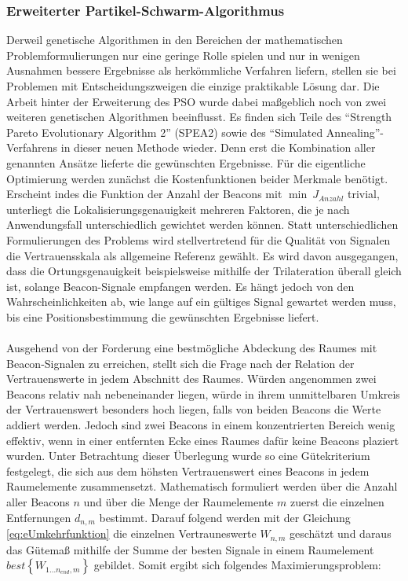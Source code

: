 \subsubsection{Erweiterter Partikel-Schwarm-Algorithmus}
Derweil genetische Algorithmen in den Bereichen der mathematischen Problemformulierungen nur eine geringe Rolle spielen und nur in wenigen Ausnahmen bessere Ergebnisse als herkömmliche Verfahren liefern, stellen sie bei Problemen mit Entscheidungszweigen die einzige praktikable Lösung dar. Die Arbeit hinter der Erweiterung des PSO wurde dabei maßgeblich noch von zwei weiteren genetischen Algorithmen beeinflusst. Es finden sich Teile des "`Strength Pareto Evolutionary Algorithm 2"' (SPEA2) \cite{SPEA2} sowie des "`Simulated Annealing"'-Verfahrens \cite{SimAnn} in dieser neuen Methode wieder. Denn erst die Kombination aller genannten Ansätze lieferte die gewünschten Ergebnisse. Für die eigentliche Optimierung werden zunächst die Kostenfunktionen beider Merkmale benötigt. Erscheint indes die Funktion der Anzahl der Beacons mit $\min \: J_{Anzahl}$ trivial, unterliegt die Lokalisierungsgenauigkeit mehreren Faktoren, die je nach Anwendungsfall unterschiedlich gewichtet werden können. Statt unterschiedlichen Formulierungen des Problems wird stellvertretend für die Qualität von Signalen die Vertrauensskala als allgemeine Referenz gewählt. Es wird davon ausgegangen, dass die Ortungsgenauigkeit beispielsweise mithilfe der Trilateration überall gleich ist, solange Beacon-Signale empfangen werden. Es hängt jedoch von den Wahrscheinlichkeiten ab, wie lange auf ein gültiges Signal gewartet werden muss, bis eine Positionsbestimmung die gewünschten Ergebnisse liefert. \\ \\
Ausgehend von der Forderung eine bestmögliche Abdeckung des Raumes mit Beacon-Signalen zu erreichen, stellt sich die Frage nach der Relation der Vertrauenswerte in jedem Abschnitt des Raumes. Würden angenommen zwei Beacons relativ nah nebeneinander liegen, würde in ihrem unmittelbaren Umkreis der Vertrauenswert besonders hoch liegen, falls von beiden Beacons die Werte addiert werden. Jedoch sind zwei Beacons in einem konzentrierten Bereich wenig effektiv, wenn in einer entfernten Ecke eines Raumes dafür keine Beacons plaziert wurden. Unter Betrachtung dieser Überlegung wurde so eine Gütekriterium festgelegt, die sich aus dem höhsten Vertrauenswert eines Beacons in jedem Raumelemente zusammensetzt. Mathematisch formuliert werden über die Anzahl aller Beacons $n$ und über die Menge der Raumelemente $m$ zuerst die einzelnen Entfernungen $d_{n,m}$ bestimmt. Darauf folgend werden mit der Gleichung \ref{eq:eUmkehrfunktion} die einzelnen Vertrauneswerte $W_{n,m}$ geschätzt und daraus das Gütemaß mithilfe der Summe der besten Signale in einem Raumelement $best\left \{ W_{1...n_{end},m} \right \} $ gebildet. Somit ergibt sich folgendes Maximierungsproblem:  
